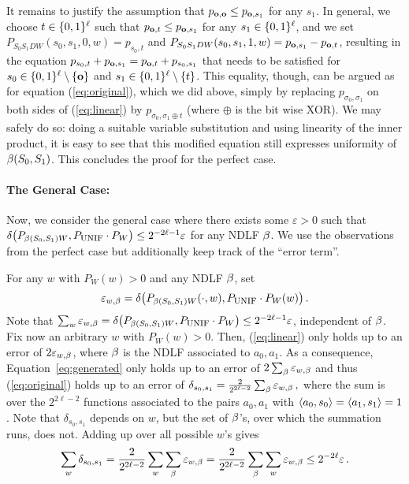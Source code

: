 It remains to justify the assumption that
$p_{\text{\boldmath${\bf o}$},\text{\boldmath${\bf o}$}} \leq p_{\text{\boldmath${\bf o}$},s_1}$ for any $s_1$. In general, we
choose $t \in \{0,1\}^{\ell}$ such that $p_{\text{\boldmath${\bf o}$},t} \leq
p_{\text{\boldmath${\bf o}$},s_1}$ for any $s_1 \in \{0,1\}^{\ell}$, and we set $P_{S_0
  S_1 D W}(s_0,s_1,0,w) = p_{s_0,t}$ and $P_{S_0 S_1 D W}(s_0,s_1,1,w)
= p_{\text{\boldmath${\bf o}$},s_1}-p_{\text{\boldmath${\bf o}$},t}$, resulting in the equation $p_{s_0,t} +
p_{\text{\boldmath${\bf o}$},s_1} = p_{\text{\boldmath${\bf o}$},t} + p_{s_0,s_1}$ that needs to be satisfied
for $s_0 \in \{0,1\}^{\ell}\setminus\{\text{\boldmath${\bf o}$}\}$ and $s_1 \in
\{0,1\}^{\ell}\setminus\{t\}$. This equality, though, can be
argued as for equation (\ref{eq:original}), which we did above, simply
by replacing $p_{\sigma_0,\sigma_1}$ on both sides of
(\ref{eq:linear}) by $p_{\sigma_0,\sigma_1 \oplus t}$ (where $\oplus$
is the bit wise XOR). We may safely do so: doing a suitable variable
substitution and using linearity of the inner product, it is easy to
see that this modified equation still expresses uniformity of
$\beta(S_0,S_1)$. This concludes the proof for the perfect case.


\paragraph{\sc The General Case: }

Now, we consider the general case where there exists some $\varepsilon
> 0$ such that $\delta\big(P_{\beta(S_0,S_1) W}, P_{\mbox{\sc unif}} \cdot P_{W}\big) \leq
2^{-2\ell-1}\varepsilon$ for any NDLF $\beta$. We use the observations
from the perfect case but additionally keep track of the ``error
term''.

For any $w$ with $P_W(w) > 0$ and any NDLF $\beta$, set 
$$
\varepsilon_{w,\beta} = \delta\big(P_{\beta(S_0,S_1)
    W}(\cdot,w),P_{\mbox{\sc unif}} \cdot P_W(w)\big)\, .
$$
Note that $\sum_w \varepsilon_{w,\beta} =\delta\big( P_{\beta(S_0,S_1) W} ,
P_{\mbox{\sc unif}} \cdot P_{W} \big) \leq 2^{-2\ell-1}\varepsilon$, independent of
$\beta$.  Fix now an arbitrary $w$ with $P_W(w) > 0$. Then,
(\ref{eq:linear}) only holds up to an error of
$2\varepsilon_{w,\beta}$, where $\beta$ is the NDLF associated to
$a_0,a_1$. As a consequence, Equation~\eqref{eq:generated} only holds
up to an error of $2 \sum_{\beta}\varepsilon_{w,\beta}$ and thus
(\ref{eq:original}) holds up to an error of $ \delta_{s_0,s_1} =
\frac{2}{2^{2\ell-2}} \sum_{\beta}\varepsilon_{w,\beta} \, , $ where the
sum is over the $2^{2\ell-2}$ functions associated to the pairs
$a_0,a_1$ with $\langle a_0,s_0\rangle = \langle a_1,s_1\rangle = 1$.  Note that
$\delta_{s_0,s_1}$ depends on $w$, but the set of $\beta$'s, over which
the summation runs, does not.  Adding up over all possible $w$'s gives
$$
\sum_w \delta_{s_0,s_1} = \frac{2}{2^{2\ell-2}} \sum_w
\sum_{\beta}\varepsilon_{w,\beta} = \frac{2}{2^{2\ell-2}} \sum_{\beta}
\sum_w \varepsilon_{w,\beta} \leq 2^{-2\ell} \varepsilon \, .
$$

